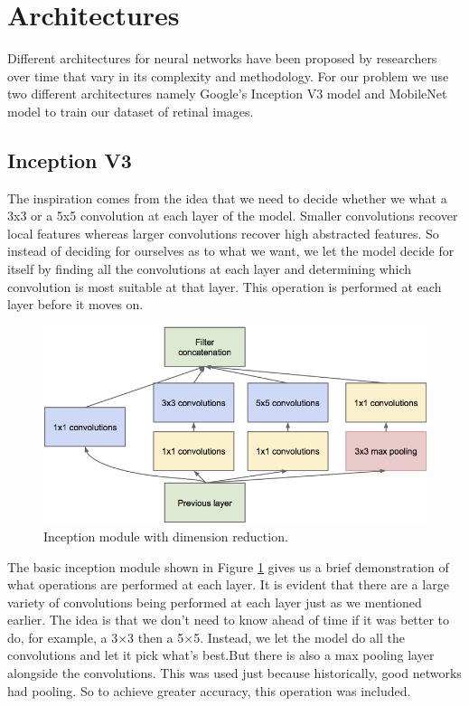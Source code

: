\documentclass[12pt]{report}
\begin{document}
\section{Architectures}
Different architectures for neural networks have been proposed by researchers over time that vary in its complexity and methodology. For our problem we use two different architectures namely Google's Inception V3 \cite{DBLP:journals/corr/SzegedyLJSRAEVR14} model and MobileNet \cite{DBLP:journals/corr/HowardZCKWWAA17} model to train our dataset of retinal images.

\subsection{Inception V3}

The inspiration comes from the idea that we need to decide whether we what a 3x3 or a 5x5 convolution at each layer of the model. Smaller convolutions recover local features whereas larger convolutions recover high abstracted features. So instead of deciding for ourselves as to what we want, we let the model decide for itself by finding all the convolutions at each layer and determining which convolution is most suitable at that layer. This operation is performed at each layer before it moves on. 

\begin{figure}[h]
\centering
\includegraphics[width=1\textwidth]{Pic2}
\caption{Inception module with dimension reduction.}
\label{fig:test5}
\end{figure}

\noindent The basic inception module shown in Figure \ref{fig:test5} gives us a brief demonstration of what operations are performed at each layer. It is evident that there are a large variety of convolutions being performed at each layer just as we mentioned earlier. The idea is that we don’t need to know ahead of time if it was better to do, for example, a 3×3 then a 5×5.  Instead, we let the model do all the convolutions and let it pick what's best.But there is also a max pooling layer alongside the convolutions. This was used just because historically, good networks had pooling. So to achieve greater accuracy, this operation was included. 
\end{document}
